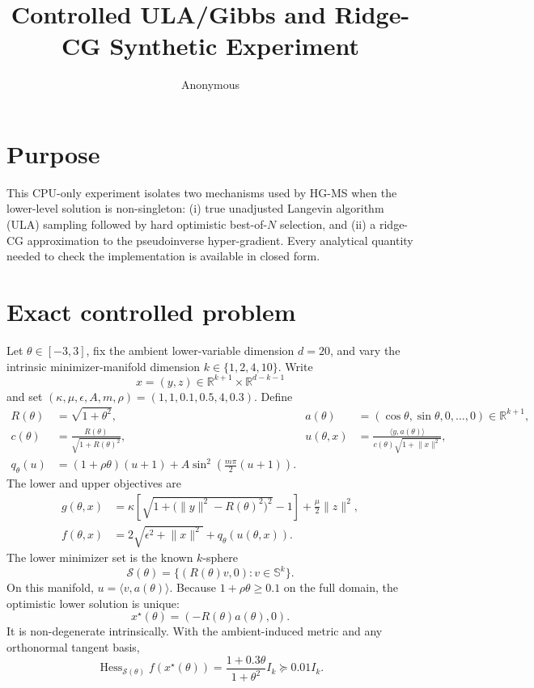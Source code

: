 \documentclass[10pt]{article}
\title{Controlled ULA/Gibbs and Ridge-CG Synthetic Experiment}
\author{Anonymous}
\date{}
\newcommand{\R}{\mathbb{R}}
\newcommand{\Sph}{\mathbb{S}}
\begin{document}
\maketitle

\section{Purpose}

This CPU-only experiment isolates two mechanisms used by HG-MS when the
lower-level solution is non-singleton: (i) true unadjusted Langevin algorithm
(ULA) sampling followed by hard optimistic best-of-$N$ selection, and (ii) a
ridge-CG approximation to the pseudoinverse hyper-gradient.  Every analytical
quantity needed to check the implementation is available in closed form.

\section{Exact controlled problem}

Let $\theta\in[-3,3]$, fix the ambient lower-variable dimension $d=20$, and
vary the intrinsic minimizer-manifold dimension
$k\in\{1,2,4,10\}$.  Write
\[
 x=(y,z)\in\R^{k+1}\times\R^{d-k-1}
\]
and set $(\kappa,\mu,\epsilon,A,m,\rho)=(1,1,0.1,0.5,4,0.3)$.  Define
\[
\begin{aligned}
R(\theta)&=\sqrt{1+\theta^2},&
a(\theta)&=(\cos\theta,\sin\theta,0,\ldots,0)\in\R^{k+1},\\
c(\theta)&=\frac{R(\theta)}{\sqrt{1+R(\theta)^2}},&
u(\theta,x)&=
\frac{\langle y,a(\theta)\rangle}
{c(\theta)\sqrt{1+\lVert x\rVert^2}},\\
q_\theta(u)&=(1+\rho\theta)(u+1)
+A\sin^2\!\left(\frac{m\pi}{2}(u+1)\right).
\end{aligned}
\]
The lower and upper objectives are
\[
\begin{aligned}
g(\theta,x)
&=\kappa\!\left[
\sqrt{1+\bigl(\lVert y\rVert^2-R(\theta)^2\bigr)^2}-1
\right]+\frac{\mu}{2}\lVert z\rVert^2,\\
f(\theta,x)
&=2\sqrt{\epsilon^2+\lVert x\rVert^2}+q_\theta(u(\theta,x)).
\end{aligned}
\]
The lower minimizer set is the known $k$-sphere
\[
\mathcal S(\theta)
=\{(R(\theta)v,0):v\in\Sph^k\}.
\]
On this manifold, $u=\langle v,a(\theta)\rangle$.  Because
$1+\rho\theta\geq0.1$ on the full domain, the optimistic lower solution is
unique:
\[
x^\star(\theta)=(-R(\theta)a(\theta),0).
\]
It is non-degenerate intrinsically.  With the ambient-induced metric and any
orthonormal tangent basis,
\[
\operatorname{Hess}_{\mathcal S(\theta)}f(x^\star(\theta))
=\frac{1+0.3\theta}{1+\theta^2}I_k
\succeq0.01I_k.
\]
\end{document}
